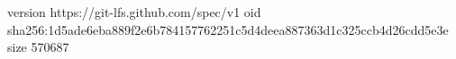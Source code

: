 version https://git-lfs.github.com/spec/v1
oid sha256:1d5ade6eba889f2e6b784157762251c5d4deea887363d1c325ccb4d26cdd5e3e
size 570687
